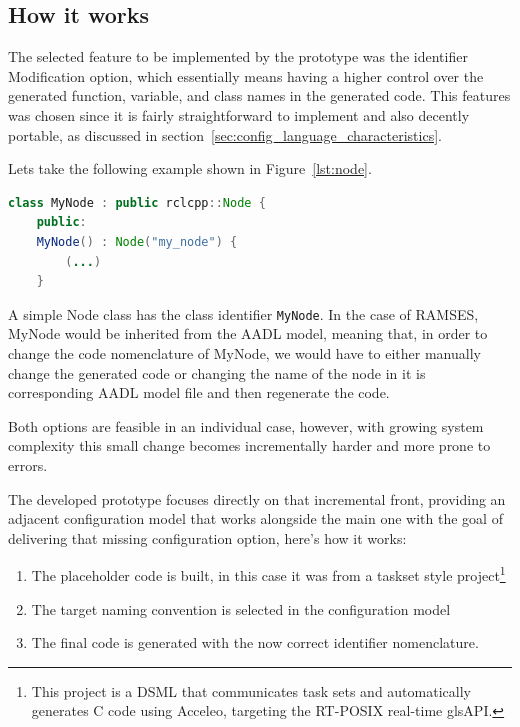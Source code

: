 \subsection{How it works}
\label{sec:how_it_works}

The selected feature to be implemented by the prototype was the \Gls{identifier} Modification option, which essentially means having a higher control over the generated function, variable, and class names in the generated code. This features was chosen since it is fairly straightforward to implement and also decently portable, as discussed in section~\ref{sec:config_language_characteristics}. 

Lets take the following example shown in Figure~\ref{lst:node}.

\begin{lstlisting}[language=Java, caption={Example node class}, label={lst:node}]
class MyNode : public rclcpp::Node {
	public:
	MyNode() : Node("my_node") {
		(...)
	}
\end{lstlisting}

A simple Node class has the class \gls{identifier} \texttt{MyNode}. In the case of \gls{RAMSES}, MyNode would be inherited from the \gls{AADL} model, meaning that, in order to change the code nomenclature of MyNode, we would have to either manually change the generated code or changing the name of the node in it is corresponding \gls{AADL} model file and then regenerate the code.

Both options are feasible in an individual case, however, with growing system complexity this small change becomes incrementally harder and more prone to errors.

The developed prototype focuses directly on that incremental front, providing an adjacent configuration model that works alongside the main one with the goal of delivering that missing configuration option, here's how it works:

\begin{enumerate}
	\item The placeholder code is built, in this case it was from a taskset style project\footnote{This project is a \gls{DSML} that communicates task sets and automatically generates C code using Acceleo, targeting the RT-POSIX real-time gls{API}.}
	\item The target naming convention is selected in the configuration model
	\item The final code is generated with the now correct \gls{identifier} nomenclature.
\end{enumerate}
 
